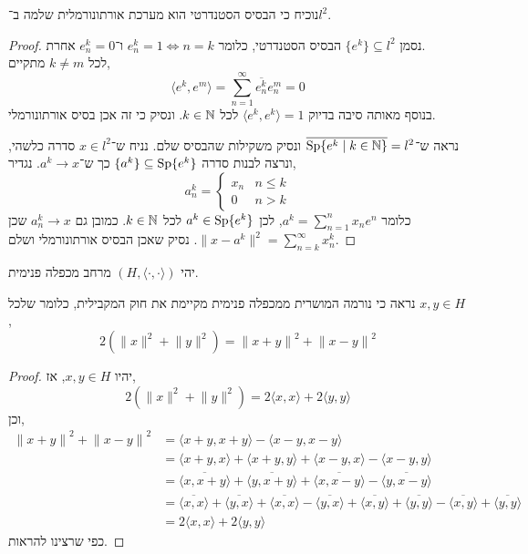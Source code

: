 \question{}
נוכיח כי הבסיס הסטנדרטי הוא מערכת אורתונורמלית שלמה ב־$l^2$.
\begin{proof}
	נסמן ${\{ e^k \}} \subseteq l^2$ הבסיס הסטנדרטי, כלומר $e_n^k = 1 \iff n = k$ ו־$e_n^k = 0$ אחרת. \\
	לכל $k \ne m$ מתקיים,
	\[
		\langle e^k, e^m \rangle
		= \sum_{n = 1}^\infty \overline{e_n^k} e_n^m
		= 0
	\]
	בנוסף מאותה סיבה בדיוק $\langle e^k, e^k \rangle = 1$ לכל $k \in \NN$.
	ונסיק כי זה אכן בסיס אורתונורמלי.

	נראה ש־$\overline{\Sp\{ e^k \mid k \in \NN \}} = l^2$ ונסיק משקילות שהבסיס שלם.
	נניח ש־$x \in l^2$ סדרה כלשהי, ונרצה לבנות סדרה ${\{ a^k \}} \subseteq \Sp\{ e^k \}$ כך ש־$a^k \to x$.
	נגדיר,
	\[
		a_n^k
		= \begin{cases}
			x_n & n \le k \\
			0 & n > k
		\end{cases}
	\]
	כלומר $a^k = \sum_{n = 1}^n x_n e^n$, לכן $a^k \in \Sp\{ e^k \}$ לכל $k \in \NN$.
	כמובן גם $a_n^k \to x$ שכן $\lVert x - a^k \rVert^2 = \sum_{n = k}^\infty x_n^k$.
	נסיק שאכן הבסיס אורתונורמלי ושלם.
\end{proof}

\question{}
יהי $(H, \langle \cdot, \cdot \rangle)$ מרחב מכפלה פנימית.

\subquestion{}
נראה כי נורמה המושרית ממכפלה פנימית מקיימת את חוק המקבילית, כלומר שלכל $x, y \in H$,
\[
	2( \lVert x \rVert^2 + \lVert y \rVert^2) = {\lVert x + y \rVert}^2 + {\lVert x - y \rVert}^2
\]
\begin{proof}
	יהיו $x, y \in H$, אז,
	\[
		2( \lVert x \rVert^2 + \lVert y \rVert^2) 
		= 2 \langle x, x \rangle + 2 \langle y, y \rangle
	\]
	וכן,
	\begin{align*}
		{\lVert x + y \rVert}^2 + {\lVert x - y \rVert}^2
		& = \langle x + y, x + y \rangle - \langle x - y, x - y \rangle \\
		& = \langle x + y, x \rangle + \langle x + y, y \rangle + \langle x - y, x \rangle - \langle x - y, y \rangle \\
		& = \overline{\langle x, x + y \rangle} + \overline{\langle y, x + y \rangle} + \overline{\langle x, x - y \rangle} - \overline{\langle y, x - y \rangle} \\
		& = \overline{\langle x, x \rangle} + \overline{\langle y, x \rangle} + \overline{\langle x, x \rangle} - \overline{\langle y, x \rangle}
		+ \overline{\langle x, y \rangle} + \overline{\langle y, y \rangle} - \overline{\langle x, y \rangle} + \overline{\langle y, y \rangle} \\
		& = 2 \langle x, x \rangle + 2 \langle y, y \rangle
	\end{align*}
	כפי שרצינו להראות.
\end{proof}

